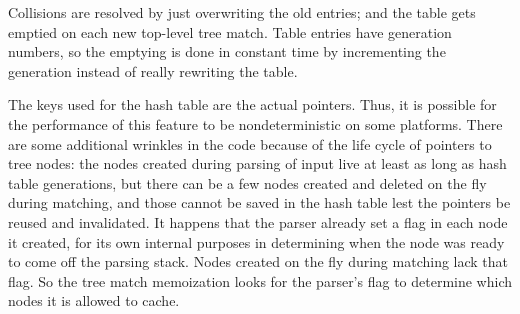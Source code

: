 \documentclass[twocolumn]{report}
\begin{document}
Collisions are resolved by just overwriting the old entries; and the table
gets emptied on each new top-level tree match.  Table entries have
generation numbers, so the emptying is done in constant time by
incrementing the generation instead of really rewriting the table.

The keys used for the hash table are the actual pointers.  Thus, it is
possible for the performance of this feature to be nondeterministic on some
platforms.  There are some additional wrinkles in the code because of the
life cycle of pointers to tree nodes: the nodes created during parsing of
input live at least as long as hash table generations, but there can be a
few nodes created and deleted on the fly during matching, and those cannot
be saved in the hash table lest the pointers be reused and invalidated.  It
happens that the parser already set a flag in each node it created, for its
own internal purposes in determining when the node was ready to come off the
parsing stack.  Nodes created on the fly during matching lack that flag.  So
the tree match memoization looks for the parser's flag to determine which
nodes it is allowed to cache.


\clearpage
{}



\end{document}
